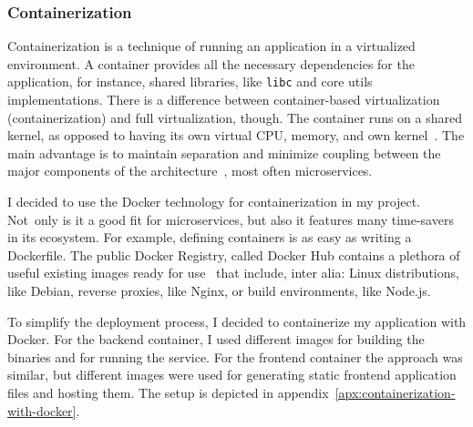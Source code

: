 \subsubsection{Containerization}\label{sec:containerization}

Containerization is a technique of running an application
in a virtualized environment.
A container provides all the necessary dependencies
for the application,
for instance, shared libraries,
like \texttt{libc} and core utils implementations.
There is a difference between container-based virtualization
(containerization) and full virtualization, though.
The container runs on a shared kernel,
as opposed to having its own
virtual CPU, memory, and own kernel~\cite{watada_emerging_2019}.
The main advantage is to maintain separation
and minimize coupling between
the major components of the architecture~\cite{stytz_rapid_1997},
most often microservices.

I decided to use the Docker technology
for containerization in my project.
Not~only is it a good fit for microservices,
but also it features many time-savers in its ecosystem.
For example,
defining containers
is as easy as writing a Dockerfile.
The public Docker Registry,
called Docker Hub contains a plethora
of useful existing images ready for use~\cite{jaramillo_leveraging_2016}
that include, inter alia:
Linux distributions, like Debian,
reverse proxies, like Nginx,
or build environments, like Node.js.

To simplify the deployment process,
I decided to containerize my application
with Docker.
For the backend container,
I used different images
for building the binaries
and for running the service.
For the frontend container the approach was similar,
but different images were used
for generating static frontend application files
and hosting them.
The setup is depicted in appendix~\ref{apx:containerization-with-docker}.
